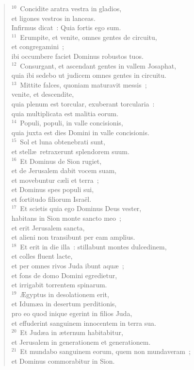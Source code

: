 \begin{flushleft}
\begin{verse}
${}^{10}$~Concidite aratra vestra in gladios,\\ et ligones vestros in lanceas.\\ Infirmus dicat~: Quia fortis ego sum.\\
${}^{11}$~Erumpite, et venite, omnes gentes de circuitu,\\ et congregamini~;\\ ibi occumbere faciet Dominus robustos tuos.\\
${}^{12}$~Consurgant, et ascendant gentes in vallem Josaphat,\\ quia ibi sedebo ut judicem omnes gentes in circuitu.\\
${}^{13}$~Mittite falces, quoniam maturavit messis~;\\ venite, et descendite,\\ quia plenum est torcular, exuberant torcularia~:\\ quia multiplicata est malitia eorum.\\
${}^{14}$~Populi, populi, in valle concisionis,\\ quia juxta est dies Domini in valle concisionis.\\
${}^{15}$~Sol et luna obtenebrati sunt,\\ et stell\ae\ retraxerunt splendorem suum.\\
${}^{16}$~Et Dominus de Sion rugiet,\\ et de Jerusalem dabit vocem suam,\\ et movebuntur c\ae li et terra~;\\ et Dominus spes populi sui,\\ et fortitudo filiorum Isra\"el.\\
${}^{17}$~Et scietis quia ego Dominus Deus vester,\\ habitans in Sion monte sancto meo~;\\ et erit Jerusalem sancta,\\ et alieni non transibunt per eam amplius.\\
${}^{18}$~Et erit in die illa~: stillabunt montes dulcedinem,\\ et colles fluent lacte,\\ et per omnes rivos Juda ibunt aqu\ae~;\\ et fons de domo Domini egredietur,\\ et irrigabit torrentem spinarum.\\
${}^{19}$~\AE gyptus in desolationem erit,\\ et Idum\ae a in desertum perditionis,\\ pro eo quod inique egerint in filios Juda,\\ et effuderint sanguinem innocentem in terra sua.\\
${}^{20}$~Et Jud\ae a in \ae ternum habitabitur,\\ et Jerusalem in generationem et generationem.\\
${}^{21}$~Et mundabo sanguinem eorum, quem non mundaveram~;\\ et Dominus commorabitur in Sion.\end{verse}\end{flushleft}



